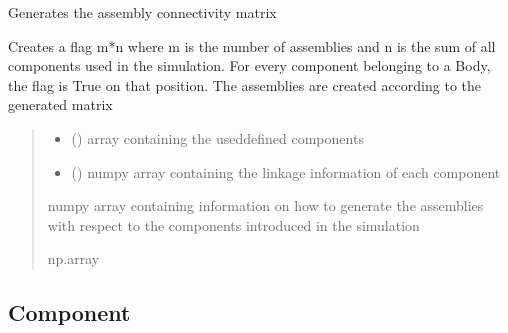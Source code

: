 \documentclass[letterpaper,10pt,english]{sphinxmanual}
\begin{document}
\begin{fulllineitems}
\label{\detokenize{modules:assembly.create_assembly_flag}}
\pysigstartsignatures
{}
\pysigstopsignatures
\sphinxAtStartPar
Generates the assembly connectivity matrix

\sphinxAtStartPar
Creates a flag m*n where m is the number of assemblies and n is the sum of all components used in the simulation.
For every component belonging to a Body, the flag is True on that position.
The assemblies are created according to the generated matrix
\begin{quote}\begin{description}
\begin{itemize}
\item {} 
\sphinxAtStartPar
{} () \textendash{} array containing the used\sphinxhyphen{}defined components

\item {} 
\sphinxAtStartPar
{} () \textendash{} numpy array containing the linkage information of each component

\end{itemize}

\sphinxAtStartPar
{} \textendash{} numpy array containing information on how to generate the assemblies with respect to the components introduced in the simulation

\sphinxAtStartPar
np.array

\end{description}\end{quote}

\end{fulllineitems}



\subsection{Component}
\label{\detokenize{modules:component}}
\end{document}
